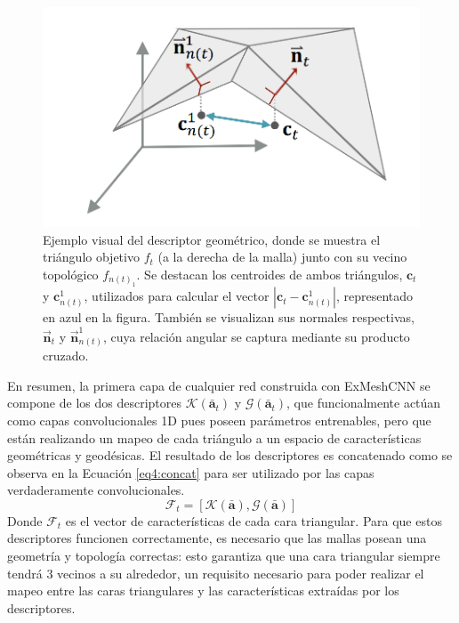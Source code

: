\begin{figure}[hb]
    \centering
    \includegraphics[width=0.75\linewidth]{figures/4_materials-methods/geometric_decriptor.png}
    \caption[Ejemplo visual del descriptor geométrico]{Ejemplo visual del descriptor geométrico, donde se muestra el triángulo objetivo $f_t$ (a la derecha de la malla) junto con su vecino topológico $f_{n(t)_1}$. Se destacan los centroides de ambos triángulos, $\textbf{c}_{t}$ y $ \textbf{c}_{n(t)}^{1}$, utilizados para calcular el vector $\left| \textbf{c}_{t} - \textbf{c}_{n(t)}^{1} \right|$, representado en azul en la figura. También se visualizan sus normales respectivas, $\overrightarrow{\textbf{n}}_{t}$ y $\overrightarrow{\textbf{n}}_{n(t)}^{1}$, cuya relación angular se captura mediante su producto cruzado.}
    \label{geom_descrp}
\end{figure}


En resumen, la primera capa de cualquier red construida con ExMeshCNN se compone de los dos descriptores $\mathcal{K}(\bar{\textbf{a}}_t)$ y $\mathcal{G}(\bar{\textbf{a}}_t)$, que funcionalmente actúan como capas convolucionales 1D pues poseen parámetros entrenables, pero que están realizando un mapeo de cada triángulo a un espacio de características geométricas y geodésicas. El resultado de los descriptores es concatenado como se observa en la Ecuación \ref{eq4:concat} para ser utilizado por las capas verdaderamente convolucionales.
\begin{equation}
    \label{eq4:concat}
    \mathcal{F}_{t} = \left[\mathcal{K}(\bar{\textbf{a}}), \mathcal{G}(\bar{\textbf{a}}) \right]
\end{equation}
Donde $\mathcal{F}_{t}$ es el vector de características de cada cara triangular. Para que estos descriptores funcionen correctamente, es necesario que las mallas posean una geometría y topología correctas: esto garantiza que una cara triangular siempre tendrá 3 vecinos a su alrededor, un requisito necesario para poder realizar el mapeo entre las caras triangulares y las características extraídas por los descriptores. 

